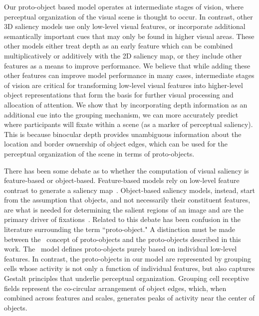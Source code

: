 Our proto-object based model operates at intermediate stages of vision, where perceptual organization of the visual scene is thought to occur. In contrast, other 3D saliency models use only low-level visual features, or incorporate additional semantically important cues
that may only be found in higher visual areas. These other models either treat depth as an early feature which can be combined multiplicatively or additively with the 2D saliency map, or they include other features \citep[such as human face and body detection,][]{Cerf_etal08} as a means to improve performance.  We believe that while adding these other features can improve model performance in many cases, intermediate stages of vision are critical
for transforming low-level visual features into higher-level object
representations that form the basis for further visual processing and
allocation of attention.  We show that by incorporating depth information as an additional cue into the grouping mechanism, we can
more accurately predict where participants will fixate within a scene (\ie as a marker of perceptual saliency). This is because binocular depth provides unambiguous information about the location and border
ownership of object edges, which can be used for the perceptual
organization of the scene in terms of proto-objects.
 
There has been some debate as to whether the computation of visual
saliency is feature-based or object-based. Feature-based models rely on low-level feature contrast to generate a saliency map~\citep[\eg][]{Itti_etal98a,Walther_Koch06}. Object-based saliency models, instead, start from the assumption that objects, and not necessarily their constituent features, are what is needed for determining the salient regions of an image and are the primary driver
of fixations~\citep{Einhauser_etal08a,Nuthman_Henderson10,Stoll_etal15}.
Related to this debate has been confusion in the literature surrounding the term ``proto-object." A distinction must be made between the~\cite{Walther_Koch06} concept of proto-objects and the
proto-objects described in this work. The~\cite{Walther_Koch06} model
defines proto-objects purely based on individual low-level features. In contrast, the proto-objects in our model are represented by grouping cells whose activity is not only a function of individual features, but also captures Gestalt principles that underlie perceptual organization. Grouping cell receptive fields represent the co-circular arrangement of object edges, which, when combined across features and scales, generates peaks of activity near the center of objects.

